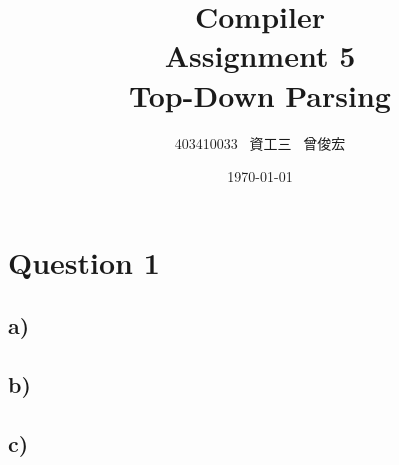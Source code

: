 \documentclass[12pt, A4]{article}
\title{Compiler \\ Assignment 5 \\ Top-Down Parsing}
\author{403410033 \ 資工三 \ 曾俊宏}
\date{\today}
\begin{document}
	
	\maketitle
	\newpage

	\section{Question 1}
	
	\subsection*{a)}
	
	
	
	\subsection*{b)}
	
	
	
	\subsection*{c)}
	
	
	
\end{document}
